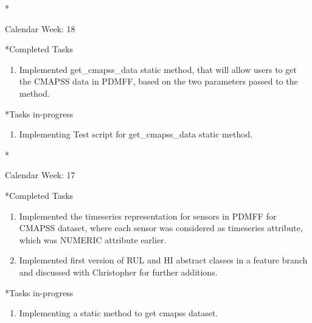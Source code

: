 \documentclass[11pt,a4paper]{article}
\begin{document}
\newpage
\begin{section}*{Calendar Week: 18  \hfill \date{07 May, 2021}}
 \begin{refsection}
     \begin{subsection}*{Completed Tasks}
         \begin{enumerate}
             \item Implemented get\_cmapss\_data static method, that will allow users to get the CMAPSS data in PDMFF, based on the two parameters passed to the method.
         \end{enumerate}
     \end{subsection}
     \begin{subsection}*{Tasks in-progress}
         \begin{enumerate}
             \item Implementing Test script for get\_cmapss\_data static method.
         \end{enumerate}
     \end{subsection}
 \end{refsection}
\end{section}
\newpage
\begin{section}*{Calendar Week: 17  \hfill \date{30 April, 2021}}
 \begin{refsection}
     \begin{subsection}*{Completed Tasks}
         \begin{enumerate}
             \item Implemented the timeseries representation for sensors in PDMFF for CMAPSS dataset, where each sensor was considered as timeseries attribute, which was NUMERIC attribute earlier.
             \item Implemented first version of RUL and HI abstract classes in a feature branch and discussed with Christopher for further additions.
         \end{enumerate}
     \end{subsection}
     \begin{subsection}*{Tasks in-progress}
         \begin{enumerate}
             \item Implementing a static method to get cmapss dataset.
         \end{enumerate}
     \end{subsection}
 \end{refsection}
\end{section}
\end{document}
